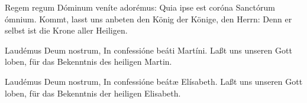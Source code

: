 \documentclass[fontsize=9pt,paper=A6,twoside,BCOR=1mm,DIV=22,headinclude]{scrarticle}
\begin{document}
\begin{paracol}{2}\pcb
	Regem regum Dóminum veníte adorémus: \red{*} Quia ipse est coróna Sanctórum ómnium.
	\switchcolumn 
	Kommt, lasst uns anbeten den König der Könige, den Herrn: \red{*} Denn er selbst ist die Krone aller Heiligen.
\end{paracol}

\begin{paracol}{2}\pcb
	Laudémus Deum nostrum, \red{*} In confessióne beáti Martíni.
	\switchcolumn 
	Laßt uns unseren Gott loben, \red{*} für das Bekenntnis des heiligen Martin.
\end{paracol}

\begin{paracol}{2}\pcb
	Laudémus Deum nostrum, \red{*} In confessióne beátæ Elísabeth.
	\switchcolumn 
	Laßt uns unseren Gott loben, \red{*} für das Bekenntnis der heiligen Elisabeth.
\end{paracol}

\ornamentvi
\end{document}
